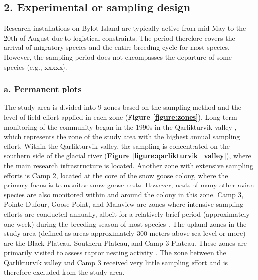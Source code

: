 \documentclass[a4paper,twoside,12pt]{article}
\begin{document}
        \subsection*{2. Experimental or sampling design}
Research installations on Bylot Island are typically active from mid-May to the 20th of August due to logistical constraints. The period therefore covers the arrival of migratory species and the entire breeding cycle for most species. However, the sampling period does not encompasses the departure of some species (e.g., xxxxx).

                        \subsubsection*{a. Permanent plots}
The study area is divided into 9 zones based on the sampling method and the level of field effort applied in each zone (\textbf{Figure \ref{figure:zones}}). Long-term monitoring of the community began in the 1990s in the Qarlikturvik valley \citep{gauthier2013, gauthier2024a}, which represents the zone of the study area with the highest annual sampling effort. Within the Qarlikturvik valley, the sampling is concentrated on the southern side of the glacial river (\textbf{Figure \ref{figure:qarlikturvik_valley}}), where the main research infrastructure is located. Another zone with extensive sampling efforts is Camp 2, located at the core of the snow goose colony, where the primary focus is to monitor snow goose nests. However, nests of many other avian species are also monitored within and around the colony in this zone. Camp 3, Pointe Dufour, Goose Point, and Malaview are zones where intensive sampling efforts are conducted annually, albeit for a relatively brief period (approximately one week) during the breeding season of most species \citep{gauthier2024a}. The upland zones in the study area (defined as areas approximately 300 meters above sea level or more) are the Black Plateau, Southern Plateau, and Camp 3 Plateau. These zones are primarily visited to assess raptor nesting activity \citep{beardsell2016}. The zone between the Qarlikturvik valley and Camp 3 received very little sampling effort and is therefore excluded from the study area.
\end{document}
